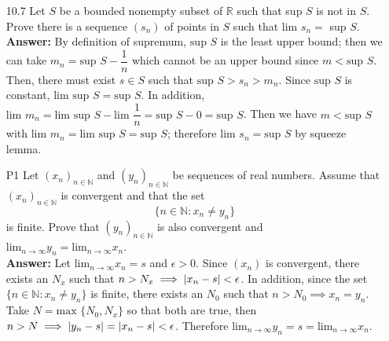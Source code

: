 \documentclass{article}
\begin{document}
\begin{itemize}
\begin{itemize}
            \end{itemize}
      \item [10.7] Let $S$ be a bounded nonempty subset of $\mathbb{R}$ such that sup $S$ is not in $S$. Prove there is a sequence $(s_n)$ of points in $S$ such that $\text{lim }s_n=$ sup $S$.\\
      \textbf{Answer: } By definition of supremum, $\text{sup }S$ is the least upper bound; then we can take $m_n=\text{sup }S-\dfrac{1}{n}$ which cannot be an upper bound since $m<\text{sup }S$. Then, there must exist $s\in S$ such that $\text{sup }S>s_n>m_n$. Since $\text{sup }S$ is constant, $\text{lim sup }S=\text{sup }S$. In addition, $\text{lim }m_n=\text{lim sup }S-\text{lim }\dfrac{1}{n}=\text{sup }S-0=\text{sup }S$. Then we have $m<\text{sup }S$ with $\text{lim }m_n=\text{lim sup }S=\text{sup }S$; therefore $\text{lim }s_n=\text{sup }S$ by squeeze lemma.
      \item [P1] Let $(x_n)_{n\in\mathbb{N}}$ and $(y_n)_{n\in\mathbb{N}}$ be sequences of real numbers. Assume that $(x_n)_{n\in\mathbb{N}}$ is convergent and that the set \[\{n\in\mathbb{N}:x_n\neq y_n\}\] is finite. Prove that $(y_n)_{n\in\mathbb{N}}$ is also convergent and $\text{lim}_{n\rightarrow\infty}y_n=\text{lim}_{n\rightarrow\infty}x_n$.\\
      \textbf{Answer: } Let $\text{lim}_{n\rightarrow\infty}x_n=s$ and $\epsilon>0$. Since $(x_n)$ is convergent, there exists an $N_x$ such that $n>N_x\implies\abs{x_n-s}<\epsilon$. In addition, since the set $\{n\in\mathbb{N}:x_n\neq y_n\}$ is finite, there exists an $N_0$ such that $n>N_0\implies x_n=y_n$. Take $N=\text{max }\{N_0,N_x\}$ so that both are true, then $n>N\implies\abs{y_n-s}=\abs{x_n-s}<\epsilon$. Therefore  $\text{lim}_{n\rightarrow\infty}y_n=s=\text{lim}_{n\rightarrow\infty}x_n$.
\end{itemize}
\end{document}
